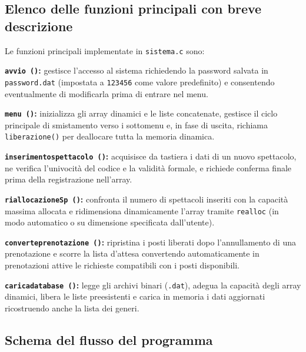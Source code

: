 \documentclass[11pt,a4paper,oneside,openany]{book}
\newenvironment{listacomp}{%
    \small
    \begin{list}{\textendash}{%
        \setlength{\topsep}{2pt}%
        \setlength{\partopsep}{0pt}%
        \setlength{\itemsep}{1pt}%
        \setlength{\parsep}{0pt}%
        \setlength{\leftmargin}{1.2em}%
    }%
}{%
    \end{list}%
}
\begin{document}
\subsection{Elenco delle funzioni principali con breve descrizione}
Le funzioni principali implementate in \texttt{sistema.c} sono:
\begin{listacomp}
    \item \textbf{\texttt{avvio ()}:} gestisce l'accesso al sistema richiedendo la password salvata in \texttt{password.dat} (impostata a \texttt{123456} come valore predefinito) e consentendo eventualmente di modificarla prima di entrare nel menu.
    \item \textbf{\texttt{menu ()}:} inizializza gli array dinamici e le liste concatenate, gestisce il ciclo principale di smistamento verso i sottomenu e, in fase di uscita, richiama \texttt{liberazione()} per deallocare tutta la memoria dinamica.
    \item \textbf{\texttt{inserimentospettacolo ()}:} acquisisce da tastiera i dati di un nuovo spettacolo, ne verifica l'univocità del codice e la validità formale, e richiede conferma finale prima della registrazione nell'array.
    \item \textbf{\texttt{riallocazioneSp ()}:} confronta il numero di spettacoli inseriti con la capacità massima allocata e ridimensiona dinamicamente l'array tramite \texttt{realloc} (in modo automatico o su dimensione specificata dall'utente).
    \item \textbf{\texttt{converteprenotazione ()}:} ripristina i posti liberati dopo l'annullamento di una prenotazione e scorre la lista d'attesa convertendo automaticamente in prenotazioni attive le richieste compatibili con i posti disponibili.
    \item \textbf{\texttt{caricadatabase ()}:} legge gli archivi binari (\texttt{.dat}), adegua la capacità degli array dinamici, libera le liste preesistenti e carica in memoria i dati aggiornati ricostruendo anche la lista dei generi.
\end{listacomp}

\subsection{Schema del flusso del programma}
\end{document}
